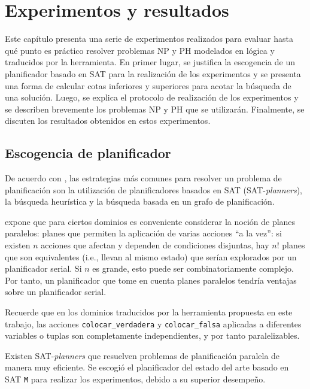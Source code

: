 \chapter{Experimentos y resultados}
\label{Chapter4}

Este capítulo presenta una serie de experimentos realizados para evaluar hasta
qué punto es práctico resolver problemas NP y PH modelados en lógica y
traducidos por la herramienta.
En primer lugar, se justifica la escogencia de un planificador basado en SAT
para la realización de los experimentos y se presenta una forma de calcular
cotas inferiores y superiores para acotar la búsqueda de una solución. Luego,
se explica el protocolo de realización de los experimentos y se describen brevemente 
los problemas NP y PH que se utilizarán. Finalmente, se discuten los resultados
obtenidos en estos experimentos.

\section{Escogencia de planificador}
De acuerdo con \cite{russell:book}, las estrategias más comunes para resolver
un problema de planificación son la utilización de planificadores basados en
SAT (SAT-\textit{planners}), la búsqueda heurística y la búsqueda basada en un
grafo de planificación.

\cite{rintanen:notes} expone que para ciertos dominios es conveniente
considerar la noción de planes paralelos: planes que permiten la aplicación de
varias acciones ``a la vez'': si existen $n$ acciones que afectan y dependen de
condiciones disjuntas, hay $n!$ planes que son equivalentes (i.e., llevan al
mismo estado) que serían explorados por un planificador serial. Si $n$ es
grande, esto puede ser combinatoriamente complejo. Por tanto, un planificador
que tome en cuenta planes paralelos tendría ventajas sobre un planificador
serial.

Recuerde que en los dominios traducidos por la herramienta propuesta en este
trabajo, las acciones \texttt{colocar\_verdadera} y \texttt{colocar\_falsa}
aplicadas a diferentes variables o tuplas son completamente independientes, y
por tanto paralelizables.

Existen SAT-\textit{planners} que resuelven problemas de
planificación paralela de manera muy eficiente. Se escogió el planificador del
estado del arte basado en SAT \texttt{M} \citep{rintanen:m} para realizar los experimentos, 
debido a su superior desempeño.

